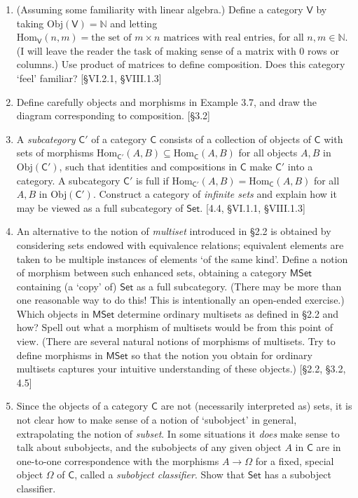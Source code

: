 \begin{enumerate}
    \item (Assuming some familiarity with linear algebra.) Define a category $\mathsf{V}$ by taking $\mathrm{Obj}(\mathsf{V}) = \mathbb{N}$ and letting $\mathrm{Hom}_{\mathsf{V}}(n, m) = \text{the set of } m \times n \text{ matrices with real entries}$, for all $n, m \in \mathbb{N}$. (I will leave the reader the task of making sense of a matrix with 0 rows or columns.) Use product of matrices to define composition. Does this category `feel' familiar? [\S VI.2.1, \S VIII.1.3]

    \item Define carefully objects and morphisms in Example 3.7, and draw the diagram corresponding to composition. [\S3.2]

    \item A \textit{subcategory} $\mathsf{C}'$ of a category $\mathsf{C}$ consists of a collection of objects of $\mathsf{C}$ with sets of morphisms $\mathrm{Hom}_{\mathsf{C}'}(A, B) \subseteq \mathrm{Hom}_{\mathsf{C}}(A, B)$ for all objects $A, B$ in $\mathrm{Obj}(\mathsf{C}')$, such that identities and compositions in $\mathsf{C}$ make $\mathsf{C}'$ into a category. A subcategory $\mathsf{C}'$ is full if $\mathrm{Hom}_{\mathsf{C}'}(A, B) = \mathrm{Hom}_{\mathsf{C}}(A, B)$ for all $A, B$ in $\mathrm{Obj}(\mathsf{C}')$. Construct a category of \textit{infinite sets} and explain how it may be viewed as a full subcategory of $\mathsf{Set}$. [4.4, \S VI.1.1, \S VIII.1.3]

    \item An alternative to the notion of \textit{multiset} introduced in \S2.2 is obtained by considering sets endowed with equivalence relations; equivalent elements are taken to be multiple instances of elements `of the same kind'. Define a notion of morphism between such enhanced sets, obtaining a category $\mathsf{MSet}$ containing (a `copy' of) $\mathsf{Set}$ as a full subcategory. (There may be more than one reasonable way to do this! This is intentionally an open-ended exercise.) Which objects in $\mathsf{MSet}$ determine ordinary multisets as defined in \S2.2 and how? Spell out what a morphism of multisets would be from this point of view. (There are several natural notions of morphisms of multisets. Try to define morphisms in $\mathsf{MSet}$ so that the notion you obtain for ordinary multisets captures your intuitive understanding of these objects.) [\S2.2, \S3.2, 4.5]
        
    \item Since the objects of a category $\mathsf{C}$ are not (necessarily interpreted as) sets, it is not clear how to make sense of a notion of `subobject' in general, extrapolating the notion of \emph{subset}. In some situations it \textit{does} make sense to talk about subobjects, and the subobjects of any given object $A$ in $\mathsf{C}$ are in one-to-one correspondence with the morphisms $A \to \Omega$ for a fixed, special object $\Omega$ of $\mathsf{C}$, called a \textit{subobject classifier}. Show that $\mathsf{Set}$ has a subobject classifier.
    

\end{enumerate}
